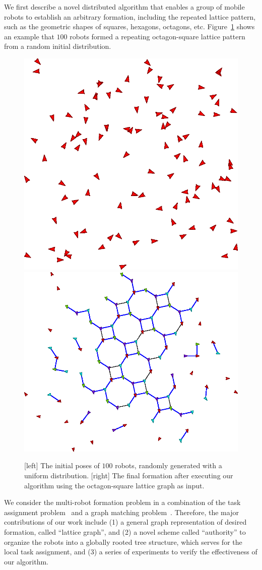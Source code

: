 We first describe a novel distributed algorithm that enables a group of mobile
robots to establish an arbitrary formation, including the repeated lattice
pattern, such as the geometric shapes of squares, hexagons, octagons, etc.
Figure~\ref{fig:octsq-init-final} shows an example that $100$ robots formed 
a repeating octagon-square lattice pattern from a random initial distribution.
\begin{figure}
  \centering
  \includegraphics[width=.4\columnwidth]{figs/initial-formation}
  \bigskip
  \includegraphics[width=.45\columnwidth]{figs/final-formation}
  \caption{[left] The initial poses of $100$ robots, randomly generated with a
  uniform distribution. [right] The final formation after executing our
  algorithm using the octagon-square lattice graph as input.}
  \label{fig:octsq-init-final}
\end{figure}
We consider the multi-robot formation problem in a combination of the task
assignment problem~\cite{Kuh55, Mun57} and a graph matching
problem~\cite{Lov86}. Therefore, the major contributions of our work include (1)
a general graph representation of desired formation, called ``lattice graph'',
and (2) a novel scheme called ``authority'' to organize the robots into a
globally rooted tree structure, which serves for the local task assignment, 
and (3) a series of experiments to verify the effectiveness of our algorithm.

